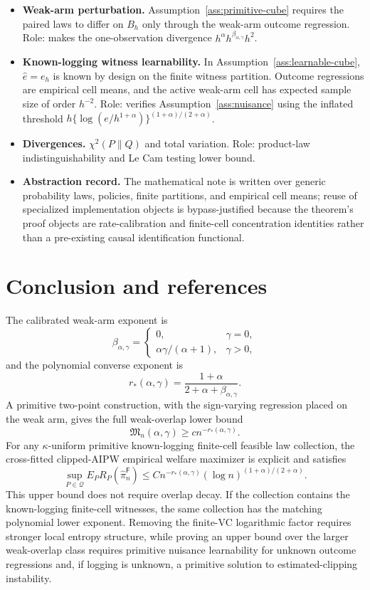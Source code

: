 \documentclass[11pt]{article}
\theoremstyle{definition}
\theoremstyle{plain}
\theoremstyle{remark}
\begin{document}
\begin{itemize}[leftmargin=*]
\item \textbf{Weak-arm perturbation.}
Assumption~\ref{ass:primitive-cube} requires the paired laws to differ on
\(B_h\) only through the weak-arm outcome regression.  Role: makes the
one-observation divergence \(h^\alpha h^{\beta_{\alpha,\gamma}}h^2\).
\item \textbf{Known-logging witness learnability.}  In
Assumption~\ref{ass:learnable-cube}, \(\widehat e=e_h\) is known by
design on the finite witness partition.  Outcome regressions are empirical
cell means, and the active weak-arm cell has expected sample size of order
\(h^{-2}\).  Role: verifies Assumption~\ref{ass:nuisance} using the inflated
threshold \(h\{\log(e/h^{1+\alpha})\}^{(1+\alpha)/(2+\alpha)}\).
\item \textbf{Divergences.}  \(\chi^2(P\|Q)\) and total variation.  Role:
product-law indistinguishability and Le Cam testing lower bound.
\item \textbf{Abstraction record.}  The mathematical note is written over
generic probability laws, policies, finite partitions, and empirical cell
means; reuse of specialized implementation objects is bypass-justified
because the theorem's proof objects are rate-calibration and finite-cell
concentration identities rather than a pre-existing causal identification
functional.
\end{itemize}

\section{Conclusion and references}
The calibrated weak-arm exponent is
\[
\beta_{\alpha,\gamma}=
\begin{cases}
0,&\gamma=0,\\
\alpha\gamma/(\alpha+1),&\gamma>0,
\end{cases}
\]
and the polynomial converse exponent is
\[
r_*(\alpha,\gamma)=
\frac{1+\alpha}{2+\alpha+\beta_{\alpha,\gamma}}.
\]
A primitive two-point construction, with the sign-varying regression placed
on the weak arm, gives the full weak-overlap lower bound
\[
\mathfrak M_n(\alpha,\gamma)\ge c n^{-r_*(\alpha,\gamma)}.
\]
For any \(\kappa\)-uniform primitive known-logging finite-cell feasible law
collection, the cross-fitted clipped-AIPW empirical welfare maximizer is
explicit and satisfies
\[
\sup_{P\in\mathcal Q}
E_P R_P(\widehat\pi_n^{\mathsf F})
\le
C n^{-r_*(\alpha,\gamma)}
(\log n)^{(1+\alpha)/(2+\alpha)}.
\]
This upper bound does not require overlap decay.  If the collection contains
the known-logging finite-cell witnesses, the same collection has the matching
polynomial lower exponent.  Removing the finite-VC logarithmic factor
requires stronger local entropy structure, while proving an upper bound over
the larger weak-overlap class requires primitive nuisance learnability for
unknown outcome regressions and, if logging is unknown, a primitive solution
to estimated-clipping instability.
\end{document}
